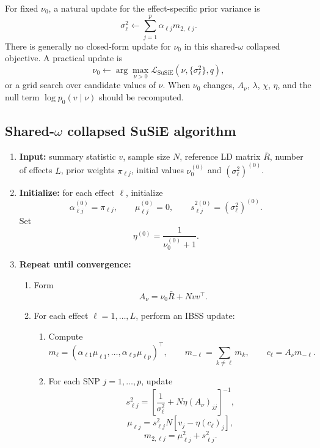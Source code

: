 \documentclass[11pt]{article}
\newcommand{\Rbar}{\bar R}
\newcommand{\nuo}{\nu_0}
\begin{document}
For fixed \(\nuo\), a natural update for the effect-specific prior
variance is
\[
\sigma_\ell^2
\leftarrow
\sum_{j=1}^p
\alpha_{\ell j}m_{2,\ell j}.
\]
There is generally no closed-form update for \(\nuo\) in this
shared-\(\omega\) collapsed objective. A practical update is
\[
\nuo
\leftarrow
\arg\max_{\nu>0}
\mathcal L_{\mathrm{SuSiE}}(\nu,\{\sigma_\ell^2\},q),
\]
or a grid search over candidate values of \(\nu\). When \(\nuo\) changes,
\(A_\nu\), \(\lambda\), \(\chi\), \(\eta\), and the null term
\(\log p_0(v\mid\nu)\) should be recomputed.

\subsection*{Shared-\(\omega\) collapsed SuSiE algorithm}

\begin{enumerate}[leftmargin=2em]

\item \textbf{Input:}
summary statistic \(v\), sample size \(N\), reference LD matrix \(\Rbar\),
number of effects \(L\), prior weights \(\pi_{\ell j}\), initial values
\(\nuo^{(0)}\) and \((\sigma_\ell^2)^{(0)}\).

\item \textbf{Initialize:}
for each effect \(\ell\), initialize
\[
\alpha_{\ell j}^{(0)}=\pi_{\ell j},
\qquad
\mu_{\ell j}^{(0)}=0,
\qquad
s_{\ell j}^{2(0)}=(\sigma_\ell^2)^{(0)}.
\]
Set
\[
\eta^{(0)}=\frac{1}{\nuo^{(0)}+1}.
\]

\item \textbf{Repeat until convergence:}

\begin{enumerate}[leftmargin=2em]

\item Form
\[
A_\nu=\nuo\Rbar+Nvv^\top.
\]

\item For each effect \(\ell=1,\dots,L\), perform an IBSS update:

\begin{enumerate}[leftmargin=2em]

\item Compute
\[
m_\ell=(\alpha_{\ell 1}\mu_{\ell 1},\dots,\alpha_{\ell p}\mu_{\ell p})^\top,
\qquad
m_{-\ell}=\sum_{k\neq\ell}m_k,
\qquad
c_\ell=A_\nu m_{-\ell}.
\]

\item For each SNP \(j=1,\dots,p\), update
\[
s_{\ell j}^2
=
\left[
\frac{1}{\sigma_\ell^2}
+
N\eta (A_\nu)_{jj}
\right]^{-1},
\]
\[
\mu_{\ell j}
=
s_{\ell j}^2
N
\left[
v_j-\eta(c_\ell)_j
\right],
\]
\[
m_{2,\ell j}
=
\mu_{\ell j}^2+s_{\ell j}^2.
\]


\end{enumerate}
\end{enumerate}
\end{enumerate}
\end{document}
